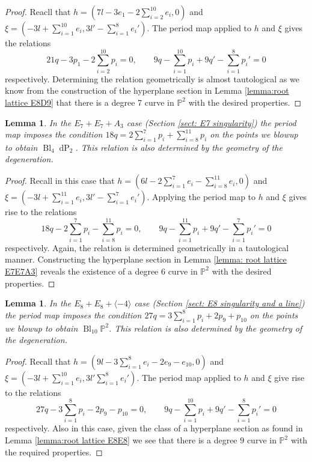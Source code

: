 \documentclass[a4paper]{amsart}
\theoremstyle{definition}
\theoremstyle{plain}
\newtheorem{lemma}[defn]{Lemma}
\theoremstyle{remark}
\newcommand{\PS}{\mathbb{P}}
\begin{document}
\begin{proof}
Reacll that $h=(7l-3e_1-2\sum_{i=2}^{10}e_i,0)$ and $\xi=(-3l+\sum_{i=1}^{10}e_i,3l'-\sum_{i=1}^{8}e_i')$. The period map applied to $h$ and $\xi$ gives the relations
$$21q-3p_1-2\sum_{i=2}^{10}p_i=0 ,\qquad 9q-\sum_{i=1}^{10}p_i+9q'-\sum_{i=1}^{8}p_i'=0$$
respectively. Determining the relation geometrically is almost tautological as we know from the construction of the hyperplane section in Lemma \ref{lemma:root lattice E8D9} that there is a degree 7 curve in $\PS^2$ with the desired properties.
\end{proof}

\begin{lemma}
In the $E_7+E_7+A_3$ case (Section \ref{sect: E7 singularity}) the period map imposes the condition $18q=2\sum_{i=1}^{7}p_i+\sum_{i=8}^{11}p_i$ on the points we blowup to obtain $\operatorname{Bl}_{4}\operatorname{dP}_2$. This relation is also determined by the geometry of the degeneration.
\end{lemma}

\begin{proof}
Recall in this case that $h= (6l-2\sum_{i=1}^7e_i-\sum_{i=8}^{11}e_i,0)$ and $\xi=(-3l+\sum_{i=1}^{11}e_i,3l'-\sum_{i=1}^{7}e_i')$. Applying the period map to $h$ and $\xi$ gives rise to the relations
$$18q-2\sum_{i=1}^7p_i-\sum_{i=8}^{11}p_i=0 , \qquad 9q-\sum_{i=1}^{11}p_i+9q'-\sum_{i=1}^{7}p_i'=0$$
respectively. Again, the relation is determined geometrically in a tautological manner. Constructing the hyperplane section in Lemma \ref{lemma: root lattice E7E7A3} reveals the existence of a degree 6 curve in $\PS^2$ with the desired properties.
\end{proof}

\begin{lemma}
In the $E_8+E_8+\langle -4 \rangle$ case (Section \ref{sect: E8 singularity and a line}) the period map imposes the condition $27q=3\sum_{i=1}^{8}p_i+2p_9+p_{10}$ on the points we blowup to obtain $\operatorname{Bl}_{10}\PS^2$. This relation is also determined by the geometry of the degeneration.
\end{lemma}

\begin{proof}
Recall that $h=(9l-3\sum_{i=1}^8e_i-2e_9-e_{10},0)$ and $\xi=(-3l+\sum_{i=1}^{10}e_i,3l'\sum_{i=1}^{8}e_i')$. The period map applied to $h$ and $\xi$ give rise to the relations
$$27q-3\sum_{i=1}^{8}p_i-2p_9-p_{10}=0 ,\qquad 9q -\sum_{i=1}^{10}p_i+9q'-\sum_{i=1}^{8}p_i'=0$$
respectively. Also in this case, given the class of a hyperplane section as found in Lemma \ref{lemma:root lattice E8E8} we see that there is a degree $9$ curve in $\PS^2$ with the required properties.
\end{proof}
\end{document}
